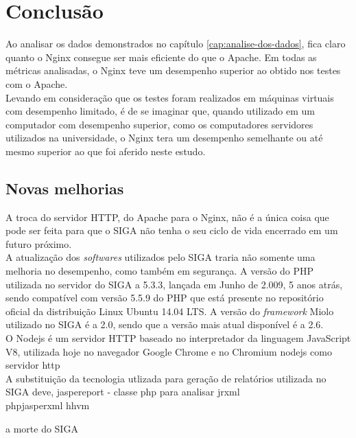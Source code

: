 \chapter{Conclusão}\label{cap:conclusao}
Ao analisar os dados demonstrados no capítulo \ref{cap:analise-dos-dados}, fica 
claro quanto o Nginx consegue ser mais eficiente do que o Apache. Em todas as 
métricas analisadas, o Nginx teve um desempenho superior ao obtido nos testes 
com o Apache.\\
Levando em consideração que os testes foram realizados em máquinas virtuais com 
desempenho limitado, é de se imaginar que, quando utilizado em um computador 
com desempenho superior, como os computadores servidores utilizados na 
universidade, o Nginx tera um desempenho semelhante ou até mesmo superior ao 
que foi aferido neste estudo.
\section{Novas melhorias}
A troca do servidor HTTP, do Apache para o Nginx, não é a única coisa que pode 
ser feita para que o SIGA não tenha o seu ciclo de vida encerrado em um futuro 
próximo.\\
A atualização dos \textit{softwares} utilizados pelo SIGA traria não somente 
uma melhoria no desempenho, como também em segurança. A versão do PHP utilizada 
no servidor do SIGA a 5.3.3, lançada em Junho de 2.009, 5 anos atrás, sendo 
compatível com versão 5.5.9 do PHP que está presente no repositório oficial da 
distribuição Linux Ubuntu 14.04 LTS. A versão do \textit{framework} Miolo 
utilizado no SIGA é a 2.0, sendo que a versão mais atual disponível é a 2.6.\\


O Nodejs é um servidor HTTP baseado no interpretador da linguagem JavaScript 
V8, utilizada hoje no navegador Google Chrome e no Chromium
nodejs como servidor http\\
A substituição da tecnologia utlizada para geração de relatórios utilizada no 
SIGA deve, 
jaspereport - classe php para analisar jrxml\\
phpjasperxml
hhvm

a morte do SIGA\\
